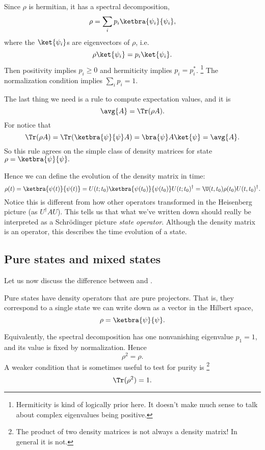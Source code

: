 Since $\rho$ is hermitian, it has a spectral decomposition,
\begin{equation}
    \rho = \sum_i p_i \ketbra{\psi_i}{\psi_i},
\end{equation}
where the $\ket{\psi_i}$s are eigenvectors of $\rho$, i.e.
\begin{equation}
    \rho\ket{\psi_i} = p_i \ket{\psi_i}.
\end{equation}
Then positivity implies $p_i\geq 0$ and hermiticity implies $p_i = p_i^*$.%
    \footnote{Hermiticity is kind of logically prior here. It doesn't make much sense to talk about complex eigenvalues being positive.}
The normalization condition implies $\sum_i p_i = 1$.

The last thing we need is a rule to compute expectation values, and it is
\begin{equation}
    \avg{A} = \Tr(\rho A).
\end{equation}
For notice that
\begin{equation}
    \Tr(\rho A) = \Tr(\ketbra{\psi}{\psi} A ) =\bra{\psi} A \ket{\psi} = \avg{A}.
\end{equation}
So this rule agrees on the simple class of density matrices for state $\rho = \ketbra{\psi}{\psi}.$

Hence we can define the evolution of the density matrix in time:
\begin{equation}
    \rho(t) = \ketbra{\psi(t)}{\psi(t)} = U(t;t_0) \ketbra{\psi(t_0)}{\psi(t_0)} U(t;t_0)^\dagger = \U(t,t_0) \rho(t_0) U(t,t_0)^\dagger.
\end{equation}
Notice this is different from how other operators transformed in the Heisenberg picture (as $U^\dagger A U$). This tells us that what we've written down should really be interpreted as a Schr\"odinger picture \emph{state operator}. Although the density matrix is an operator, this describes the time evolution of a state.

\subsection*{Pure states and mixed states}
Let us now discuss the difference between  and .
\begin{defn}
    Pure states have density operators that are pure projectors. That is, they correspond to a single state we can write down as a vector in the Hilbert space,
    \begin{equation}
        \rho = \ketbra{\psi}{\psi}.
    \end{equation}
\end{defn}
Equivalently, the spectral decomposition has one nonvanishing eigenvalue $p_1=1$, and its value is fixed by normalization. Hence 
\begin{equation}
    \rho^2 =\rho.
\end{equation}
A weaker condition that is sometimes useful to test for purity is%
    \footnote{The product of two density matrices is not always a density matrix! In general it is not.}
\begin{equation}
    \Tr(\rho^2)=1.
\end{equation}
    

